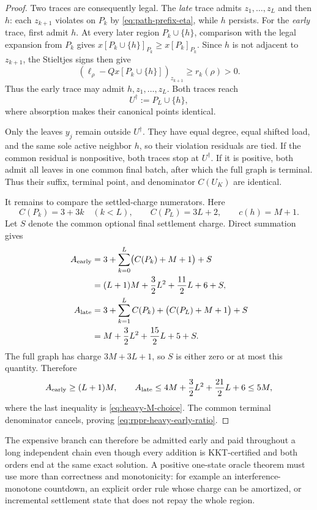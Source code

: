 \begin{proof}
Two traces are consequently legal.  The \emph{late} trace admits
$z_1,\ldots,z_L$ and then $h$: each $z_{k+1}$ violates on $P_k$ by
\eqref{eq:path-prefix-eta}, while $h$ persists.  For the \emph{early} trace,
first admit $h$.  At every later region $P_k\cup\{h\}$, comparison with the
legal expansion from $P_k$ gives
$x[P_k\cup\{h\}]_{P_k}\geq x[P_k]_{P_k}$.  Since $h$ is not adjacent to
$z_{k+1}$, the Stieltjes signs then give
\[
 (\ell_\rho-Qx[P_k\cup\{h\}])_{z_{k+1}}
 \geq r_k(\rho)>0.
\]
Thus the early trace may admit $h,z_1,\ldots,z_L$.  Both traces reach
\[
 U^\dagger:=P_L\cup\{h\},
\]
where absorption makes their canonical points identical.

Only the leaves $y_j$ remain outside $U^\dagger$.  They have equal degree,
equal shifted load, and the same sole active neighbor $h$, so their violation
residuals are tied.  If the common residual is nonpositive, both traces stop
at $U^\dagger$.  If it is positive, both admit all leaves in one common
final batch, after which the full graph is terminal.  Thus their suffix,
terminal point, and denominator $C(U_K)$ are identical.

It remains to compare the settled-charge numerators.  Here
\[
 C(P_k)=3+3k\quad(k<L),
 \qquad
 C(P_L)=3L+2,
 \qquad
 c(h)=M+1.
\]
Let $S$ denote the common optional final settlement charge.  Direct summation
gives
\begin{align}
 A_{\rm early}
 &=3+\sum_{k=0}^L\bigl(C(P_k)+M+1\bigr)+S \notag\\
 &=(L+1)M+\frac32L^2+\frac{11}{2}L+6+S,
 \label{eq:heavy-early}\\
 A_{\rm late}
 &=3+\sum_{k=1}^LC(P_k)+\bigl(C(P_L)+M+1\bigr)+S \notag\\
 &=M+\frac32L^2+\frac{15}{2}L+5+S.
 \label{eq:heavy-late}
\end{align}
The full graph has charge $3M+3L+1$, so $S$ is either zero or at most this
quantity.  Therefore
\[
 A_{\rm early}\geq(L+1)M,
 \qquad
 A_{\rm late}
 \leq4M+\frac32L^2+\frac{21}{2}L+6
 \leq5M,
\]
where the last inequality is \eqref{eq:heavy-M-choice}.  The common terminal
denominator cancels, proving \eqref{eq:rppr-heavy-early-ratio}.
\end{proof}

The expensive branch can therefore be admitted early and paid throughout a
long independent chain even though every addition is KKT-certified and both
orders end at the same exact solution.  A positive one-state oracle theorem
must use more than correctness and monotonicity: for example an
interference-monotone countdown, an explicit order rule whose charge can be
amortized, or incremental settlement state that does not repay the whole
region.

